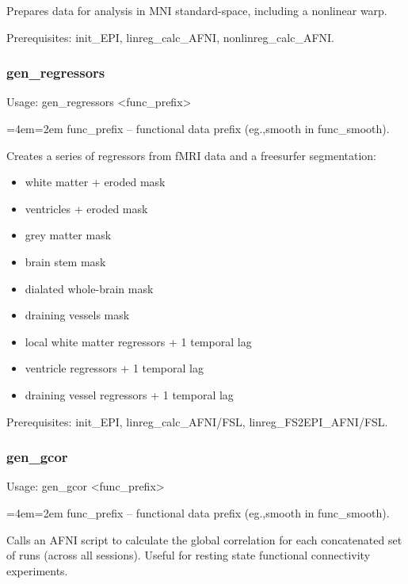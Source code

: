 \documentclass[final,titlepage,letterpaper,oneside,12pt]{article}
\renewcommand{\texttt}[2][BrickRed]{\textcolor{#1}{\ttfamily #2}}%
\newenvironment{blockquote}{%
  \par%
  \medskip
  \leftskip=4em\rightskip=2em%
  \noindent\ignorespaces}{%
  \par\medskip}
\begin{document}
\noindent Prepares data for analysis in MNI standard-space, including a nonlinear warp.

Prerequisites: \texttt{init\_EPI}, \texttt{linreg\_calc\_AFNI}, \texttt{nonlinreg\_calc\_AFNI}.

\subsubsection{gen\_regressors}
Usage: \texttt{gen\_regressors <func\_prefix>}

\begin{blockquote}
func\_prefix -- functional data prefix (eg.,smooth in func\_smooth).
\end{blockquote}

\noindent Creates a series of regressors from fMRI data and a freesurfer segmentation: 

\begin{itemize} \itemsep-2pt
	\item{white matter + eroded mask}
	\item{ventricles + eroded mask}
	\item{grey matter mask}
	\item{brain stem mask}
	\item{dialated whole-brain mask}
	\item{draining vessels mask}
	\item{local white matter regressors + 1 temporal lag}
	\item{ventricle regressors + 1 temporal lag}
	\item{draining vessel regressors + 1 temporal lag}
\end{itemize}

Prerequisites: \texttt{init\_EPI}, \texttt{linreg\_calc\_AFNI/FSL}, \texttt{linreg\_FS2EPI\_AFNI/FSL}.

\subsubsection{gen\_gcor}
Usage: \texttt{gen\_gcor <func\_prefix>}

\begin{blockquote}
func\_prefix -- functional data prefix (eg.,smooth in func\_smooth).
\end{blockquote}

\noindent Calls an AFNI script to calculate the global correlation for each concatenated set of runs (across all sessions). Useful for resting state functional connectivity experiments.
\end{document}

